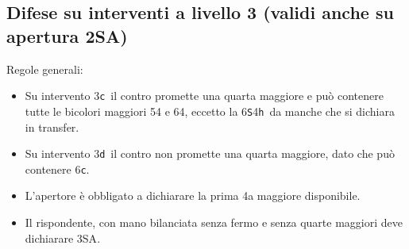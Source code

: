 \documentclass[a4paper,italian]{article}
\newcommand{\BS}{\small{\texttt{S}}}
\newcommand{\BC}{\small{\texttt{c}}}
\newcommand{\BD}{\small{\texttt{d}}}
\newcommand{\BH}{\small{\texttt{h}}}
\begin{document}
\begin{multicols}{2}
    \subsection{Difese su interventi a livello 3 (validi anche su apertura 2SA)}

    Regole generali:
    \begin{itemize}
        \item Su intervento 3\BC\ il contro promette una quarta maggiore e può contenere tutte le bicolori maggiori 54 e 64, eccetto la 6\BS 4\BH\ da manche che si dichiara in transfer.
        \item Su intervento 3\BD\ il contro non promette una quarta maggiore, dato che può contenere 6\BC .
        \item L'apertore è obbligato a dichiarare la prima 4a maggiore disponibile.
        \item Il rispondente, con mano bilanciata senza fermo e senza quarte maggiori deve dichiarare 3\small{SA}.


\end{itemize}
\end{multicols}
\end{document}
